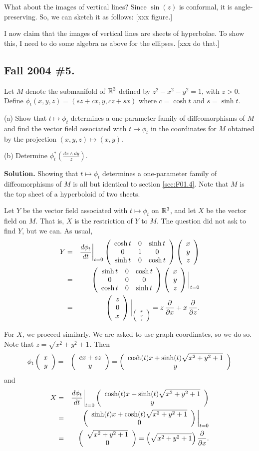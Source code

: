 \documentclass[10pt]{article}
\numberwithin{equation}{subsection}
\begin{document}
What about the images of vertical lines?  Since $\sin(z)$ is conformal, it is
angle-preserving.  So, we can sketch it as follows: [xxx figure.]

I now claim that the images of vertical lines are sheets of hyperbolae.  To
show this, I need to do some algebra as above for the ellipses.  [xxx do that.]

\subsection{Fall 2004 \#5.}

Let $M$ denote the submanifold of $\mathbb{R}^3$ defined by $z^2-x^2-y^2=1$, with
$z>0$.  Define $\phi_t(x,y,z) = (sz+cx, y, cz+sx)$ where $c=\cosh t$ and $s =
\sinh t$.

(a) Show that $t \mapsto \phi_t$ determines a one-parameter family of
diffeomorphisms of $M$ and find the vector field associated with $t \mapsto
\phi_t$ in the coordinates for $M$ obtained by the projection $(x,y,z) \mapsto
(x,y)$.

(b) Determine $\phi_t^*(\frac{dx \wedge dy}{z})$.

\textbf{Solution.}  Showing that $t \mapsto \phi_t$ determines a one-parameter
family of diffeomorphisms of $M$ is all but identical to section
\ref{sec:F01.4}.  Note that $M$ is the top sheet of a hyperboloid of two
sheets.

Let $Y$ be the vector field associated with $t \mapsto \phi_t$ on $\mathbb{R}^3$, and
let $X$ be the vector field on $M$.  That is, $X$ is the restriction of $Y$ to
$M$.  The question did not ask to find $Y$, but we can.  As usual,
\begin{eqnarray*}
	Y &=& \frac{d\phi_t}{dt}\bigg|_{\tiny{t=0}}
		\left(\begin{array}{cccccccccccc} 
			\cosh t & 0 & \sinh t \\
			0       & 1 & 0       \\
			\sinh t & 0 & \cosh t
		 \end{array}\right) \left(\begin{array}{r} x \\ y \\ z\end{array}\right) \\
	&=& \left(\begin{array}{cccccccccccc} 
			\sinh t & 0 & \cosh t \\
			0       & 0 & 0       \\
			\cosh t & 0 & \sinh t
		 \end{array}\right) \left(\begin{array}{r} x \\ y \\ z\end{array}\right) \bigg|_{\tiny{t=0}} \\
	&=& \left(\begin{array}{r} z \\ 0 \\ x\end{array}\right) \bigg|_{\tiny{\left(\begin{array}{r} x \\ y \\ z\end{array}\right)}}
	= z\,\frac{\partial}{\partial x} + x\,\frac{\partial}{\partial z}.
\end{eqnarray*}

For $X$, we proceed similarly.  We are asked to use graph coordinates, so
we do so.  Note that $z = \sqrt{x^2+y^2+1}$.  Then
\begin{eqnarray*}
	\phi_t\left(\begin{array}{r} x \\ y \end{array}\right) &=& \left(\begin{array}{c} cx + sz \\ y \end{array}\right)
	= \left(\begin{array}{c} \cosh(t) x + \sinh(t) \sqrt{x^2+y^2+1} \\ y \end{array}\right)
\end{eqnarray*}
and
\begin{eqnarray*}
	X &=& \frac{d\phi_t}{dt}\bigg|_{\tiny{t=0}}
		\left(\begin{array}{c} \cosh(t)x + \sinh(t) \sqrt{x^2+y^2+1} \\ y \end{array}\right) \\
	&=& \left(\begin{array}{c} \sinh(t)x + \cosh(t) \sqrt{x^2+y^2+1} \\ 0 \end{array}\right)
		\bigg|_{\tiny{t=0}} \\
	&=& \left(\begin{array}{c} \sqrt{x^2+y^2+1} \\ 0 \end{array}\right)
	= \left(\sqrt{x^2+y^2+1}\right) \frac{\partial}{\partial x}.
\end{eqnarray*}
\end{document}
